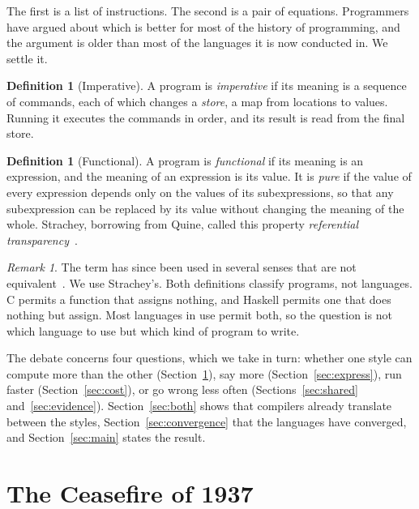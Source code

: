 \documentclass[11pt]{article}
\let\oldsection\section
\renewcommand{\section}{\Needspace{0.25\textheight}\oldsection}
\theoremstyle{definition}
\newtheorem{definition}[theorem]{Definition}
\theoremstyle{remark}
\newtheorem{remark}[theorem]{Remark}
\begin{document}
\medskip
\noindent The first is a list of instructions. The second is a pair of
equations. Programmers have argued about which is better for most of the
history of programming, and the argument is older than most of the
languages it is now conducted in. We settle it.

\begin{definition}[Imperative]
  A program is \emph{imperative} if its meaning is a sequence of
  commands, each of which changes a \emph{store}, a map from locations to
  values. Running it executes the commands in order, and its result is
  read from the final store.
\end{definition}

\begin{definition}[Functional]
  A program is \emph{functional} if its meaning is an expression, and the
  meaning of an expression is its value. It is \emph{pure} if the value
  of every expression depends only on the values of its subexpressions,
  so that any subexpression can be replaced by its value without changing
  the meaning of the whole. Strachey, borrowing from Quine, called this
  property \emph{referential transparency}~\cite{strachey}.
\end{definition}

\begin{remark}
  The term has since been used in several senses that are not
  equivalent~\cite{sondergaard}. We use Strachey's. Both definitions
  classify programs, not languages. C permits a function that assigns
  nothing, and Haskell permits one that does nothing but assign. Most
  languages in use permit both, so the question is not which language to
  use but which kind of program to write.
\end{remark}

The debate concerns four questions, which we take in turn: whether one
style can compute more than the other (Section~\ref{sec:power}), say
more (Section~\ref{sec:express}), run faster (Section~\ref{sec:cost}),
or go wrong less often (Sections~\ref{sec:shared}
and~\ref{sec:evidence}). Section~\ref{sec:both} shows that compilers
already translate between the styles, Section~\ref{sec:convergence} that
the languages have converged, and Section~\ref{sec:main} states the
result.

\section{The Ceasefire of 1937}\label{sec:power}
\end{document}
